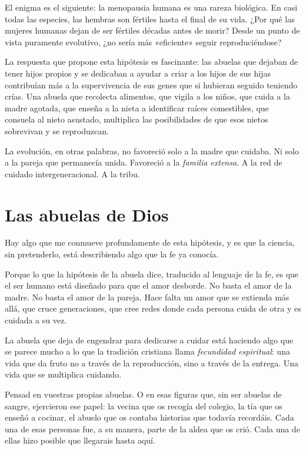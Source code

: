 El enigma es el siguiente: la menopausia humana es una rareza biológica. En casi todas las especies, las hembras son fértiles hasta el final de su vida. ¿Por qué las mujeres humanas dejan de ser fértiles décadas antes de morir? Desde un punto de vista puramente evolutivo, ¿no sería más «eficiente» seguir reproduciéndose?

La respuesta que propone esta hipótesis es fascinante: las abuelas que dejaban de tener hijos propios y se dedicaban a ayudar a criar a los hijos de sus hijas contribuían más a la supervivencia de sus genes que si hubieran seguido teniendo crías. Una abuela que recolecta alimentos, que vigila a los niños, que cuida a la madre agotada, que enseña a la nieta a identificar raíces comestibles, que consuela al nieto asustado, multiplica las posibilidades de que esos nietos sobrevivan y se reproduzcan.

La evolución, en otras palabras, no favoreció solo a la madre que cuidaba. Ni solo a la pareja que permanecía unida. Favoreció a la \emph{familia extensa}. A la red de cuidado intergeneracional. A la tribu.

\section{Las abuelas de Dios}

Hay algo que me conmueve profundamente de esta hipótesis, y es que la ciencia, sin pretenderlo, está describiendo algo que la fe ya conocía.

Porque lo que la hipótesis de la abuela dice, traducido al lenguaje de la fe, es que el ser humano está diseñado para que el amor desborde. No basta el amor de la madre. No basta el amor de la pareja. Hace falta un amor que se extienda más allá, que cruce generaciones, que cree redes donde cada persona cuida de otra y es cuidada a su vez.

La abuela que deja de engendrar para dedicarse a cuidar está haciendo algo que se parece mucho a lo que la tradición cristiana llama \emph{fecundidad espiritual}: una vida que da fruto no a través de la reproducción, sino a través de la entrega. Una vida que se multiplica cuidando.

Pensad en vuestras propias abuelas. O en esas figuras que, sin ser abuelas de sangre, ejercieron ese papel: la vecina que os recogía del colegio, la tía que os enseñó a cocinar, el abuelo que os contaba historias que todavía recordáis. Cada una de esas personas fue, a su manera, parte de la aldea que os crió. Cada una de ellas hizo posible que llegarais hasta aquí.

